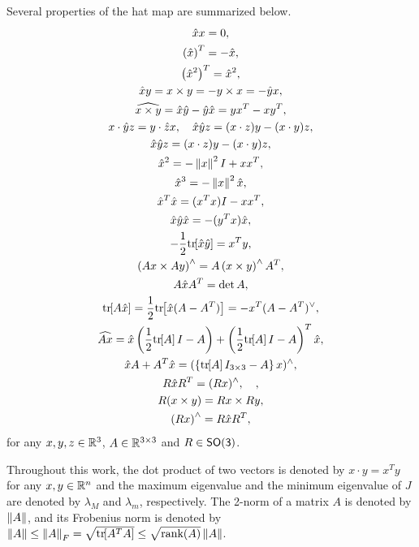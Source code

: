 Several properties of the hat map are summarized below.
\begin{gather}
    \hat{x} x = 0, \\
    \left( \hat x \right) ^T = - \hat x,\label{eq:hatxT} \\
    \left( \hat{x}^2 \right)^T = \hat x ^2, \\
    \hat x y = x\times y = - y\times x = - \hat y x, \label{eqn:cross_product}\\
    \widehat{x\times y} = \hat x \hat y -\hat y \hat x = yx^T-xy^T,\label{eq:hatxy}\\
    x\cdot \hat y z = y\cdot \hat z x,\quad \hat x\hat y z = (x\cdot z) y - (x\cdot y ) z\label{eqn:STP},\\
    \hat x\hat y z = (x\cdot z) y - (x\cdot y ) z,\label{eqn:VTP}\\
    \hat{x}^2 = - \left\| x \right\|^2 I + x x^T, \\
    \hat{x}^3 = -\left\| x \right\|^2 \hat x, \\
    \hat x^T \hat x = (x^T x) I - x x^T, \label{eq:xTx} \\
    \hat x \hat y \hat x=-(y^Tx)\hat x,\\
    -\frac{1}{2}\mathrm{tr}\negthickspace\left[ \hat x \hat y \right] = x^T y,\\
    \left( A x \times A y \right)^\wedge = A\left( x \times y \right)^\wedge A^T, \\
    A \hat x A^T = \det{A}, \\
    \mathrm{tr}\negthickspace\left[ A\hat x  \right]=\frac{1}{2}\mathrm{tr}\negthickspace\left[ \hat x (A-A^T) \right]=-x^T (A-A^T)^\vee,\label{eqn:hat1}\\
    \widehat{Ax} = \hat x \left( \frac{1}{2}\mathrm{tr}\negthickspace\left[ A \right]I-A \right) + \left( \frac{1}{2}\mathrm{tr}\negthickspace\left[ A \right]I-A \right)^T \hat x,\\
    \hat x  A+A^T\hat x=(\left\{ \mathrm{tr}\negthickspace\left[ A \right]I_{3\times 3}-A \right\}x)^{\wedge}, \label{eqn:xAAx} \\
    R\hat x R^T = (Rx)^\wedge,\quad , \label{eq:hatRxR} \\
    R(x\times y) = Rx\times Ry\label{eqn:RxR} , \\
    \left( R x \right)^\wedge = R \hat x R^T,
\end{gather}
for any $x,y,z\in\mathbb{R}^{3}$, $A\in\mathbb{R}^{3\times 3}$ and $R\in\mathsf{SO(3)}$. 

Throughout this work, the dot product of two vectors is denoted by $x\cdot y = x^T y$ for any $x,y\in\mathbb{R}^n$ and the maximum eigenvalue and the minimum eigenvalue of $J$ are denoted by $\lambda_M$ and $\lambda_m$, respectively. 
The 2-norm of a matrix \( A \) is denoted by \( \left\| A \right\| \), and its Frobenius norm is denoted by \( \left\| A \right\| \leq \left\| A \right\|_F = \sqrt{\mathrm{tr}\negthickspace\left[ A^T A \right]} \leq \sqrt{\text{rank}(A)} \left\| A \right\| \).
